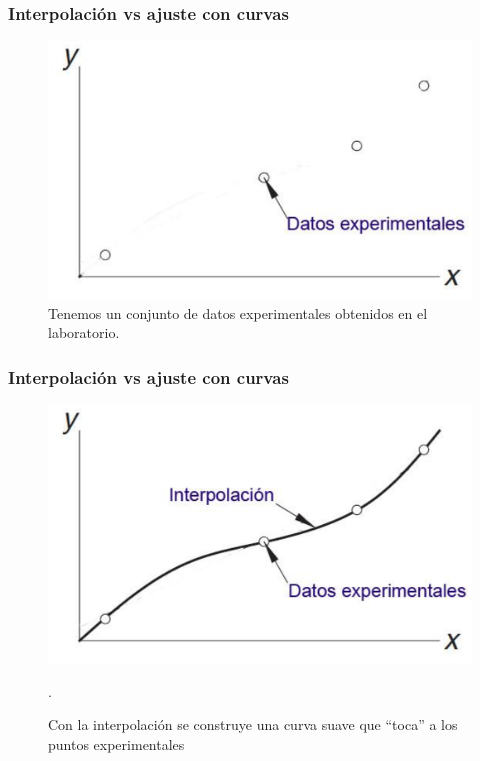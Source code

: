 \begin{frame}[fragile]
\frametitle{Interpolación vs ajuste con curvas}

\begin{figure}
\centering
\includegraphics[scale=0.55]{Imagenes/Interpol01.eps}
\caption{Tenemos un conjunto de datos experimentales obtenidos en el laboratorio.}
\end{figure}
\end{frame}
\begin{frame}[fragile]
\frametitle{Interpolación vs ajuste con curvas}
\begin{figure}
\centering
\includegraphics[scale=0.55]{Imagenes/Interpol02.eps}
\caption{Con la interpolación se construye una curva suave que \enquote{toca} a los puntos experimentales}.
\end{figure}
\end{frame}
